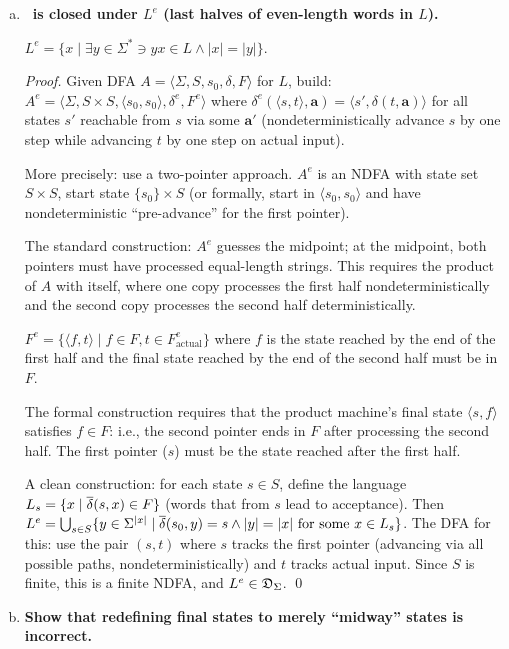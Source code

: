 \begin{enumerate}[{5.}1. ]
\begin{enumerate}[(a)]
\item \textbf{\DSIG\ is closed under $L^e$ (last halves of even-length words in $L$).}

$L^e=\{x\mid\exists y\in\Sigma^*\ni yx\in L\wedge|x|=|y|\}$.

\begin{proof}
Given DFA $A=\langle\Sigma,S,s_0,\delta,F\rangle$ for $L$, build:
$A^e=\langle\Sigma,S\times S,\langle s_0,s_0\rangle,\delta^e,F^e\rangle$ where
$\delta^e(\langle s,t\rangle,\pmb{a})=\langle s',\delta(t,\pmb{a})\rangle$ for all states $s'$ reachable from $s$ via some $\pmb{a}'$ (nondeterministically advance $s$ by one step while advancing $t$ by one step on actual input).

More precisely: use a two-pointer approach.  $A^e$ is an NDFA with state set $S\times S$, start state $\{s_0\}\times S$ (or formally, start in $\langle s_0,s_0\rangle$ and have nondeterministic ``pre-advance'' for the first pointer).

The standard construction: $A^e$ guesses the midpoint; at the midpoint, both pointers must have processed equal-length strings.  This requires the product of $A$ with itself, where one copy processes the first half nondeterministically and the second copy processes the second half deterministically.

$F^e=\{\langle f,t\rangle\mid f\in F,t\in F^e_{\text{actual}}\}$ where $f$ is the state reached by the end of the first half and the final state reached by the end of the second half must be in $F$.

The formal construction requires that the product machine's final state $\langle s,f\rangle$ satisfies $f\in F$: i.e., the second pointer ends in $F$ after processing the second half.  The first pointer ($s$) must be the state reached after the first half.

A clean construction: for each state $s\in S$, define the language $L_s=\{x\mid\overline{\delta}(s,x)\in F\}$ (words that from $s$ lead to acceptance).  Then $L^e=\bigcup_{s\in S}\{y\in\Sigma^{|x|}\mid\overline{\delta}(s_0,y)=s\wedge|y|=|x|\text{ for some }x\in L_s\}$.  The DFA for this: use the pair $(s,t)$ where $s$ tracks the first pointer (advancing via all possible paths, nondeterministically) and $t$ tracks actual input.  Since $S$ is finite, this is a finite NDFA, and $L^e\in\mathfrak{D}_\Sigma$. \qed
\end{proof}

\item \textbf{Show that redefining final states to merely ``midway'' states is incorrect.}


\end{enumerate}
\end{enumerate}
